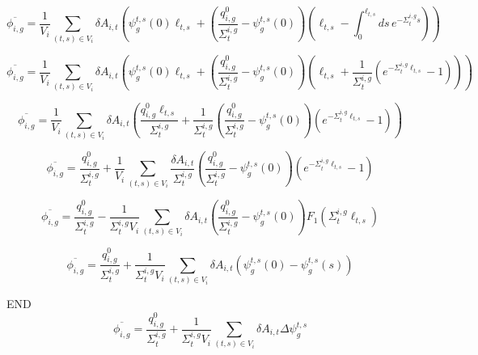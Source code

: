 \begin{dmath}
	\overline{\phi_{i,g}} = \frac{1}{V_i} \sum_{(t,s) \in V_i} \delta A_{i,t} \left( \psi^{t,s}_g(0) \ell_{t,s} + \left( \frac{q^0_{i,g}}{\Sigma_{t}^{i,g}} - \psi_g^{t,s}(0) \right) \left( \ell_{t,s} - \int_{0}^{\ell_{t,s}} ds \, e^{-\Sigma_{t}^{i,g} s} \right) \right)
\end{dmath}

\begin{dmath}
	\overline{\phi_{i,g}} = \frac{1}{V_i} \sum_{(t,s) \in V_i} \delta A_{i,t} \left( \psi^{t,s}_g(0) \ell_{t,s} + \left( \frac{q^0_{i,g}}{\Sigma_{t}^{i,g}} - \psi_g^{t,s}(0) \right) \left( \ell_{t,s} + \frac{1}{\Sigma_{t}^{i,g}} \left( e^{-\Sigma_{t}^{i,g} \ell_{t,s}} - 1\right) \right) \right)
\end{dmath}

\begin{dmath}
	\overline{\phi_{i,g}} = \frac{1}{V_i} \sum_{(t,s) \in V_i} \delta A_{i,t} \left( \frac{q^0_{i,g} \ell_{t,s}}{\Sigma_{t}^{i,g}} + \frac{1}{\Sigma_{t}^{i,g}} \left( \frac{q^0_{i,g}}{\Sigma_{t}^{i,g}} - \psi_g^{t,s}(0) \right) \left( e^{-\Sigma_{t}^{i,g} \ell_{t,s}} - 1\right) \right)
\end{dmath}

\begin{dmath}
	\overline{\phi_{i,g}} = \frac{q^0_{i,g}}{\Sigma_{t}^{i,g}} + \frac{1}{V_i} \sum_{(t,s) \in V_i} \frac{\delta A_{i,t}}{\Sigma_{t}^{i,g}} \left( \frac{q^0_{i,g}}{\Sigma_{t}^{i,g}} - \psi_g^{t,s}(0) \right) \left( e^{-\Sigma_{t}^{i,g} \ell_{t,s}} - 1\right)
\end{dmath}

\begin{dmath}
	\overline{\phi_{i,g}} = \frac{q^0_{i,g}}{\Sigma_{t}^{i,g}} - \frac{1}{\Sigma_{t}^{i,g} V_i} \sum_{(t,s) \in V_i} \delta A_{i,t} \left( \frac{q^0_{i,g}}{\Sigma_{t}^{i,g}} - \psi_g^{t,s}(0) \right) F_1\left(\Sigma_{t}^{i,g} \ell_{t,s} \right)
\end{dmath}

\begin{dmath}
	\overline{\phi_{i,g}} = \frac{q^0_{i,g}}{\Sigma_{t}^{i,g}} + \frac{1}{\Sigma_{t}^{i,g} V_i} \sum_{(t,s) \in V_i} \delta A_{i,t} \left(\psi_g^{t,s}(0) - \psi_g^{t,s}(s) \right)
\end{dmath}

END
\begin{dmath}
	\overline{\phi_{i,g}} = \frac{q^0_{i,g}}{\Sigma_{t}^{i,g}} + \frac{1}{\Sigma_{t}^{i,g} V_i} \sum_{(t,s) \in V_i} \delta A_{i,t} \Delta \psi_g^{t,s}
\end{dmath}